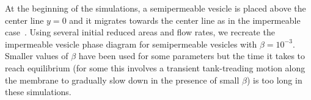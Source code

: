\documentclass[prb,preprint,showpacs,preprintnumbers,amsmath,amssymb,longbibliography]{revtex4-1}
\begin{document}
%
%
%
%
%
%

At the beginning of the simulations, a semipermeable vesicle is placed
above the center line $y=0$ and it migrates towards the center line as
in the impermeable case~\cite{dan-vla-mis2009}. 
%
%
%
Using several initial reduced areas and flow rates, we recreate the
impermeable vesicle phase diagram for semipermeable vesicles with $\beta
= 10^{-3}$. Smaller values of $\beta$ have been used for some parameters
but the time it takes to reach equilibrium (for some this involves a
transient tank-treading motion along the membrane to gradually slow down
in the presence of small $\beta$) is too long in these simulations.
\end{document}
